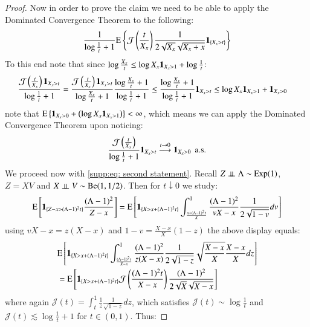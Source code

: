 \begin{proof}
			Now in order to prove the claim we need to be able to apply the Dominated Convergence Theorem to the following:
			\begin{align*}
				 \frac{1}{\log{\frac{1}{t}} + 1}\mathrm{E}\left\{ \mathcal{J}\left(\frac{t}{X_x}\right) \frac{1}{2\sqrt{X_x} \sqrt{X_x + x}} \mathbf{1}_{\{X_x > t \}} \right\} 
			\end{align*}
			To this end note that since $\log{\frac{X_x}{t}} \leq \log{X_x \mathbf{1}_{X_x >1}}+ \log{\frac{1}{t}}$:
			\begin{align*}
				\frac{\mathcal{J}\left( \frac{t}{X_x}\right)\mathbf{1}_{X_x > t}}{\log{\frac{1}{t}} + 1}  = \frac{\mathcal{J}\left( \frac{t}{X_x}\right) \mathbf{1}_{X_x > t}}{\log{\frac{X_x}{t}} + 1} \frac{\log{\frac{X_x}{t}} + 1}{\log{\frac{1}{t}} + 1}  &\leq \frac{\log{\frac{X_x}{t}} + 1}{\log{\frac{1}{t}} + 1} \mathbf{1}_{X_x > t} \leq \log{X_x \mathbf{1}_{X_x > 1}} + \mathbf{1}_{X_x > 0}
			\end{align*}
			note that $\mathrm{E}\left\{ \mathbf{1}_{X_x > 0} + \left( \log{X_x} \mathbf{1}_{X_x > 1} \right) \right\} < \infty$, which means we can apply the Dominated Convergence Theorem upon noticing:
			\begin{align*}
				\frac{\mathcal{J}\left( \frac{t}{X_x}\right)}{\log{\frac{1}{t}} + 1} \mathbf{1}_{X_x > t} \stackrel{t \rightarrow 0}{\longrightarrow} \mathbf{1}_{X_x > 0} \: \: \text{a.s.}
			\end{align*}
			We proceed now with \eqref{supp:eq: second statement}. Recall $Z \perp \!\!\! \perp \Lambda \sim \mathrm{Exp}(1)$, $Z = XV$ and $X \perp \!\!\! \perp V \sim \mathrm{Be}(1, 1/2)$. Then for $t \downarrow 0$ we study:
			\begin{align*}
				\mathrm{E} \left[ \mathbf{1}_{\{Z-x > (\Lambda - 1)^2 t\}} \frac{(\Lambda - 1)^2}{Z-x} \right] = \mathrm{E} \left[ \mathbf{1}_{\{X > x + (\Lambda - 1)^2 t\}} \int_{\frac{x + (\Lambda - 1)^2 t}{X}}^1  \frac{(\Lambda - 1)^2}{vX - x} \frac{1}{2 \sqrt{1 - v}} dv \right]
			\end{align*}
			using $vX - x = z(X-x)$ and $1-v = \frac{X-x}{X}(1-z)$ the above display equals:
			\begin{align*}
				&\mathrm{E} \left[ \mathbf{1}_{\{X > x + (\Lambda - 1)^2 t\}} \int_{\frac{(\Lambda - 1)^2 t}{X-x}}^1  \frac{(\Lambda - 1)^2}{z(X - x)} \frac{1}{2\sqrt{1-z}} \sqrt{\frac{X-x}{X}} \frac{X-x}{X} dz \right] \\
				&= \mathrm{E} \left[ \mathbf{1}_{\{X > x + (\Lambda - 1)^2 t\}} \mathcal{J}\left( \frac{(\Lambda - 1)^2 t}{X-x} \right) \frac{(\Lambda - 1)^2}{2\sqrt{X} \sqrt{X-x}} \right]
			\end{align*}
			where again $\mathcal{J}(t) = \int_{t}^{1} \frac{1}{z} \frac{1}{\sqrt{1-z}} dz$, which satisfies $\mathcal{J}(t) \sim \log \frac{1}{t}$ and $\mathcal{J}(t) \lesssim \log \frac{1}{t} + 1$ for $t \in (0,1)$. Thus:

\end{proof}

